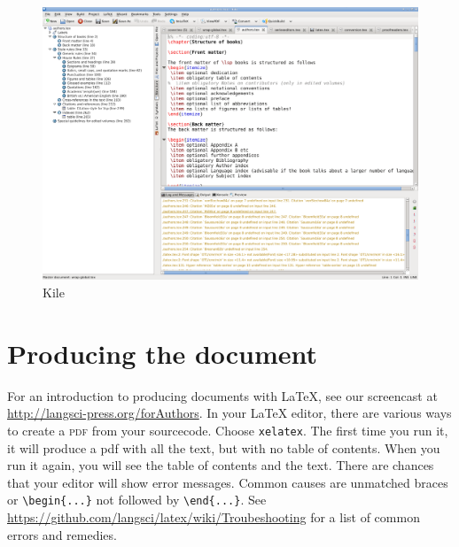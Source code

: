 \begin{figure}
\includegraphics[width=\textwidth]{kile.png}
\caption{Kile}
\label{fig:latex:kile} 
\end{figure}

  
% 
\section{Producing the document}
For an introduction to producing documents with \LaTeX\xspace, see our screencast at \url{http://langsci-press.org/forAuthors}.
In your \LaTeX\xspace editor, there are various ways to create a \textsc{pdf} from your sourcecode. Choose \verb+xelatex+. The first time you run it, it will produce a pdf with all the text, but with no table of contents. When you run it again, you will see the table of contents and the text. There are chances that your editor will show error messages. Common causes are unmatched braces or \verb+\begin{...}+ not followed by \verb+\end{...}+. See \url{https://github.com/langsci/latex/wiki/Troubeshooting} for a list of common errors and remedies.



